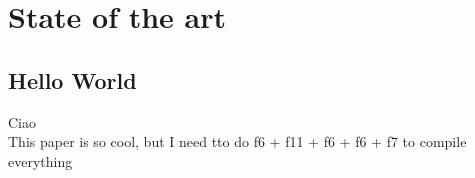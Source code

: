 \chapter{State of the art}

\section{Hello World}
Ciao\\
This paper \cite{kim_firmae_2020} is so cool, but I need tto do f6 + f11 + f6 + f6 + f7 to compile everything